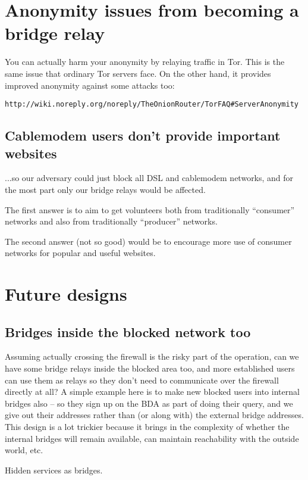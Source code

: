 \documentclass{llncs}
\begin{document}
\section{Anonymity issues from becoming a bridge relay}

You can actually harm your anonymity by relaying traffic in Tor.  This is
the same issue that ordinary Tor servers face. On the other hand, it
provides improved anonymity against some attacks too:

\begin{verbatim}
http://wiki.noreply.org/noreply/TheOnionRouter/TorFAQ#ServerAnonymity
\end{verbatim}

\subsection{Cablemodem users don't provide important websites}

...so our adversary could just block all DSL and cablemodem networks,
and for the most part only our bridge relays would be affected.

The first answer is to aim to get volunteers both from traditionally
``consumer'' networks and also from traditionally ``producer'' networks.

The second answer (not so good) would be to encourage more use of consumer
networks for popular and useful websites.

\section{Future designs}

\subsection{Bridges inside the blocked network too}

Assuming actually crossing the firewall is the risky part of the
operation, can we have some bridge relays inside the blocked area too,
and more established users can use them as relays so they don't need to
communicate over the firewall directly at all? A simple example here is
to make new blocked users into internal bridges also -- so they sign up
on the BDA as part of doing their query, and we give out their addresses
rather than (or along with) the external bridge addresses. This design
is a lot trickier because it brings in the complexity of whether the
internal bridges will remain available, can maintain reachability with
the outside world, etc.

Hidden services as bridges.

% 
\end{document}
